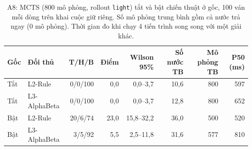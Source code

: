 \begin{table}[H]
  \centering\footnotesize
  \caption{A8: MCTS (800 mô phỏng, rollout \texttt{light}) tắt và bật chiến thuật ở gốc, 100 ván mỗi dòng trên khai cuộc giữ riêng. Số mô phỏng trung bình gồm cả nước trả ngay (0 mô phỏng). Thời gian đo khi chạy 4 tiến trình song song với một giải khác.}
  \label{tab:a8}
  \setlength{\tabcolsep}{4pt}
  \begin{tabular}{@{}llrrrrrr@{}}
    \toprule
    Gốc & Đối thủ & T/H/B & Điểm & Wilson 95\% & Số nước TB & Mô phỏng TB & P50 (ms) \\
    \midrule
    Tắt & L2-Rule & 0/0/100 & 0{,}0 & 0{,}0--3{,}7 & 10{,}6 & 800 & 597 \\
    Tắt & L3-AlphaBeta & 0/0/100 & 0{,}0 & 0{,}0--3{,}7 & 12{,}8 & 800 & 652 \\
    Bật & L2-Rule & 20/6/74 & 23{,}0 & 15{,}8--32{,}2 & 36{,}0 & 500 & 520 \\
    Bật & L3-AlphaBeta & 3/5/92 & 5{,}5 & 2{,}5--11{,}8 & 31{,}6 & 577 & 810 \\
    \bottomrule
  \end{tabular}
\end{table}
